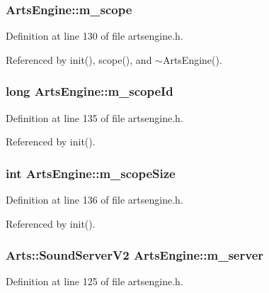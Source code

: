 \subsubsection{ {\bf Arts\-Engine::m\_\-scope}\hspace{0.3cm}{\tt  [private]}}\label{classArtsEngine_ArtsEnginer8}




Definition at line 130 of file artsengine.h.

Referenced by init(), scope(), and $\sim$Arts\-Engine().
\subsubsection{\setlength{\rightskip}{0pt plus 5cm}long {\bf Arts\-Engine::m\_\-scope\-Id}\hspace{0.3cm}{\tt  [private]}}\label{classArtsEngine_ArtsEnginer10}




Definition at line 135 of file artsengine.h.

Referenced by init().
\subsubsection{\setlength{\rightskip}{0pt plus 5cm}int {\bf Arts\-Engine::m\_\-scope\-Size}\hspace{0.3cm}{\tt  [private]}}\label{classArtsEngine_ArtsEnginer11}




Definition at line 136 of file artsengine.h.

Referenced by init().
\subsubsection{\setlength{\rightskip}{0pt plus 5cm}Arts::Sound\-Server\-V2 {\bf Arts\-Engine::m\_\-server}\hspace{0.3cm}{\tt  [private]}}\label{classArtsEngine_ArtsEnginer3}




Definition at line 125 of file artsengine.h.

